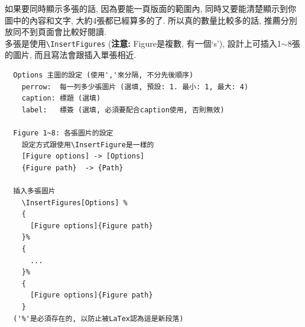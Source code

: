 \newpage
{}

  如果要同時顯示多張的話, 因為要能一頁版面的範圍內, 同時又要能清楚顯示到你圖中的內容和文字, 大約4張都已經算多的了. 所以真的數量比較多的話, 推薦分別放同不到頁面會比較好閱讀.\\

  多張是使用\verb|\InsertFigures| ({\bf 注意:} Figure是複數, 有一個`s'), 設計上可插入1$\sim$8張的圖片, 而且寫法會跟插入單張相近.

  \EmptyLine
  \begin{DescriptionFrame}
  \begin{verbatim}
  Options 主圖的設定 (使用','來分隔, 不分先後順序)
    perrow:  每一列多少張圖片 (選填, 預設: 1. 最小: 1, 最大: 4)
    caption: 標題 (選填)
    label:   標簽 (選填, 必須要配合caption使用, 否則無效)

  Figure 1~8: 各張圖片的設定
    設定方式跟使用\InsertFigure是一樣的
    [Figure options] -> [Options]
    {Figure path}  -> {Path}

  插入多張圖片
    \InsertFigures[Options] %
    {
      [Figure options]{Figure path}
    }%
    {
      ...
    }%
    {
      [Figure options]{Figure path}
    }
  ('%'是必須存在的, 以防止被LaTex認為這是新段落)
  \end{verbatim}
  \end{DescriptionFrame}

  \newpage

